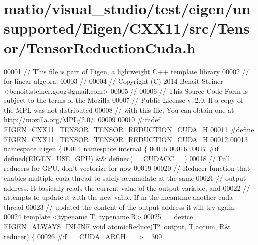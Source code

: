 \hypertarget{matio_2visual__studio_2test_2eigen_2unsupported_2_eigen_2_c_x_x11_2src_2_tensor_2_tensor_reduction_cuda_8h_source}{}\section{matio/visual\+\_\+studio/test/eigen/unsupported/\+Eigen/\+C\+X\+X11/src/\+Tensor/\+Tensor\+Reduction\+Cuda.h}
\label{matio_2visual__studio_2test_2eigen_2unsupported_2_eigen_2_c_x_x11_2src_2_tensor_2_tensor_reduction_cuda_8h_source}

\begin{DoxyCode}
00001 \textcolor{comment}{// This file is part of Eigen, a lightweight C++ template library}
00002 \textcolor{comment}{// for linear algebra.}
00003 \textcolor{comment}{//}
00004 \textcolor{comment}{// Copyright (C) 2014 Benoit Steiner <benoit.steiner.goog@gmail.com>}
00005 \textcolor{comment}{//}
00006 \textcolor{comment}{// This Source Code Form is subject to the terms of the Mozilla}
00007 \textcolor{comment}{// Public License v. 2.0. If a copy of the MPL was not distributed}
00008 \textcolor{comment}{// with this file, You can obtain one at http://mozilla.org/MPL/2.0/.}
00009 
00010 \textcolor{preprocessor}{#ifndef EIGEN\_CXX11\_TENSOR\_TENSOR\_REDUCTION\_CUDA\_H}
00011 \textcolor{preprocessor}{#define EIGEN\_CXX11\_TENSOR\_TENSOR\_REDUCTION\_CUDA\_H}
00012 
00013 \textcolor{keyword}{namespace }\hyperlink{namespace_eigen}{Eigen} \{
00014 \textcolor{keyword}{namespace }\hyperlink{namespaceinternal}{internal} \{
00015 
00016 
00017 \textcolor{preprocessor}{#if defined(EIGEN\_USE\_GPU) && defined(\_\_CUDACC\_\_)}
00018 \textcolor{comment}{// Full reducers for GPU, don't vectorize for now}
00019 
00020 \textcolor{comment}{// Reducer function that enables multiple cuda thread to safely accumulate at the same}
00021 \textcolor{comment}{// output address. It basically reads the current value of the output variable, and}
00022 \textcolor{comment}{// attempts to update it with the new value. If in the meantime another cuda thread}
00023 \textcolor{comment}{// updated the content of the output address it will try again.}
00024 \textcolor{keyword}{template} <\textcolor{keyword}{typename} T, \textcolor{keyword}{typename} R>
00025 \_\_device\_\_ EIGEN\_ALWAYS\_INLINE \textcolor{keywordtype}{void} atomicReduce(\hyperlink{group___sparse_core___module_class_eigen_1_1_triplet}{T}* output, \hyperlink{group___sparse_core___module_class_eigen_1_1_triplet}{T} accum, R& reducer) \{
00026 \textcolor{preprocessor}{#if \_\_CUDA\_ARCH\_\_ >= 300}

\end{DoxyCode}
